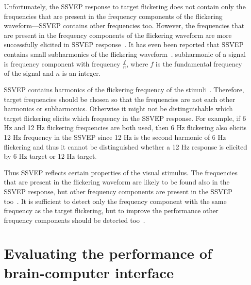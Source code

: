 Unfortunately, the \gls{SSVEP} response to \gls{target} \gls{flickering} does not contain only the frequencies that are present in the \glspl{frequency component} of the \gls{flickering waveform}---\gls{SSVEP} contains other frequencies too. However, the frequencies that are present in the \glspl{frequency component} of the \gls{flickering waveform} are more successfully elicited in \gls{SSVEP} response~\cite{square_sine}. It has even been reported that \gls{SSVEP} contains small \glspl{subharmonic} of the \gls{flickering waveform}~\cite{ssvep_response}. \Gls{subharmonic} of a signal is \gls{frequency component} with frequency $\frac{f}{n}$, where $f$ is the \gls{fundamental} frequency of the signal and $n$ is an integer.

\gls{SSVEP} contains \glspl{harmonic} of the \gls{flickering} frequency of the stimuli~\cite{ssvep_response}. Therefore, \gls{target} frequencies should be chosen so that the frequencies are not each other \glspl{harmonic} or \glspl{subharmonic}. Otherwise it might not be distinguishable which \gls{target} \gls{flickering} elicits which frequency in the \gls{SSVEP} response. For example, if 6 Hz and 12 Hz \gls{flickering} frequencies are both used, then 6 Hz \gls{flickering} also elicits 12 Hz frequency in the \gls{SSVEP} since 12 Hz is the second harmonic of 6 Hz \gls{flickering} and thus it cannot be distinguished whether a 12 Hz response is elicited by 6 Hz \gls{target} or 12 Hz \gls{target}.

Thus \gls{SSVEP} reflects certain properties of the visual stimulus. The frequencies that are present in the \gls{flickering waveform} are likely to be found also in the \gls{SSVEP} response, but other \glspl{frequency component} are present in the \gls{SSVEP} too~\cite{square_sine}. It is sufficient to detect only the \gls{frequency component} with the same frequency as the \gls{target} \gls{flickering}, but to improve the performance other \glspl{frequency component} should be detected too~\cite{harmonic_imrpovement}.


\section{Evaluating the performance of brain-computer interface}

